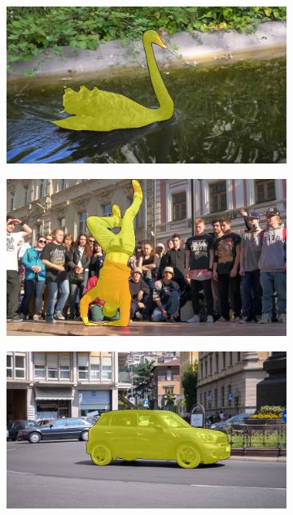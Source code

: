 \begin{figure}
\centering
\begin{subfigure}{.25\textwidth}
  \includegraphics[width=1.\linewidth]{figures/davis_dataset/blackswan.jpg}
\end{subfigure}%
\begin{subfigure}{.25\textwidth}
  \includegraphics[width=1.\linewidth]{figures/davis_dataset/breakdance.jpg}
\end{subfigure}%
\begin{subfigure}{.25\textwidth}
  \includegraphics[width=1.\linewidth]{figures/davis_dataset/car-roundabout.jpg}

\end{subfigure}
\end{figure}
